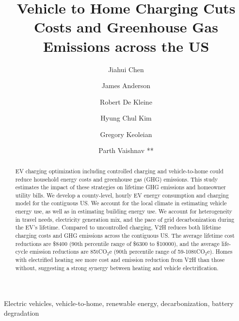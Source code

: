 \documentclass[11pt,preprint]{elsarticle}
\begin{document}
 
\begin{frontmatter}
	\title{Vehicle to Home Charging Cuts Costs and Greenhouse Gas Emissions across the US}
    \author[umichaddress]{Jiahui Chen}
    
    \author[fordaddress]{James Anderson}
    \author[fordaddress]{Robert De Kleine}
    \author[fordaddress]{Hyung Chul Kim}
    \author[umichaddress]{Gregory Keoleian}
    \author[umichaddress]{Parth Vaishnav **}
        \address[umichaddress]{School for Environment and Sustainability, University of Michigan, Ann Arbor, MI 48109, USA}
        \address[fordaddress]{Ford Research and Innovation Center, 2101 Village Rd, Dearborn, MI 48124, USA}
        
        
	\begin{abstract}
		EV charging optimization including controlled charging and vehicle-to-home could reduce household energy costs and greenhouse gas (GHG) emissions. This study estimates the impact of these strategies on lifetime GHG emissions and homeowner utility bills. We develop a county-level, hourly EV energy consumption and charging model for the contiguous US. We account for the local climate in estimating vehicle energy use, as well as in estimating building energy use. We account for heterogeneity in travel needs, electricity generation mix, and the pace of grid decarbonization during the EV's lifetime. Compared to uncontrolled charging, V2H reduces both lifetime charging costs and GHG emissions across the contiguous US. The average lifetime cost reductions are \$8400 (90th percentile range of \$6300 to \$10000), and the average life-cycle emission reductions are 85tCO$_2$e (90th percentile range of 59-108tCO$_2$e). Homes with electrified heating see more cost and emission reduction from V2H than those without, suggesting a strong synergy between heating and vehicle electrification.
	\end{abstract}

	\begin{keyword}
		Electric vehicles, vehicle-to-home, renewable energy, decarbonization, battery degradation
	\end{keyword}


\end{frontmatter}

\newpage

\linenumbers
\end{document}
